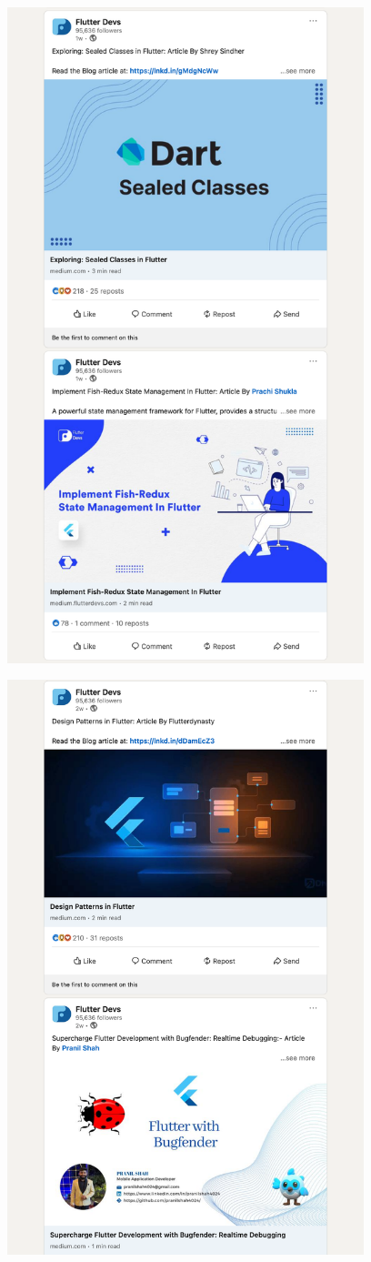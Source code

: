 \Continuing
\begin{center}
    \includegraphics[width=28em]{flutter-devs-posts-p6}
\end{center}
\WillContinue
\pagebreak

\Continuing
\begin{center}
    \includegraphics[width=28em]{flutter-devs-posts-p7}
\end{center}

\pagebreak
